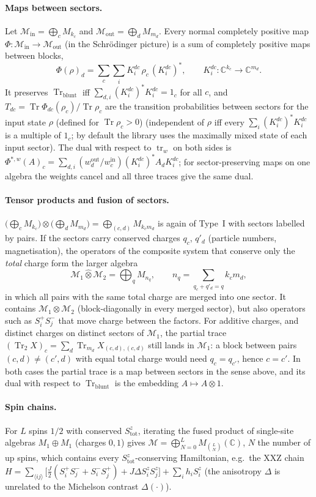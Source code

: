 \documentclass[11pt]{article}
\DeclareMathOperator{\Tr}{Tr}
\newcommand{\C}{\mathbb{C}}
\newcommand{\M}{\mathcal{M}}
\begin{document}
\paragraph{Maps between sectors.} Let $\M_{\mathrm{in}}=\bigoplus_c M_{k_c}$ and
$\M_{\mathrm{out}}=\bigoplus_d M_{m_d}$. Every normal completely positive map
$\Phi:\M_{\mathrm{in}}\to\M_{\mathrm{out}}$ (in the Schrödinger picture) is a sum of completely
positive maps between blocks,
\[
  \Phi(\rho)_d=\sum_c\sum_i K^{dc}_i\,\rho_c\,(K^{dc}_i)^*,\qquad K^{dc}_i:\C^{k_c}\to\C^{m_d}.
\]
It preserves $\Tr_{\mathrm{blunt}}$ iff $\sum_{d,i}(K_i^{dc})^*K_i^{dc}=1_c$ for all $c$, and
$T_{dc}=\Tr\Phi_{dc}(\rho_c)/\Tr\rho_c$ are the transition probabilities between sectors for the input
state $\rho$ (defined for $\Tr\rho_c>0$) (independent of $\rho$ iff every $\sum_i(K_i^{dc})^*K_i^{dc}$ is a multiple of $1_c$; by default the
library uses the maximally mixed state of each input sector). The dual
with respect to $\operatorname{tr}_w$ on both sides is
$\Phi^{*,w}(A)_c=\sum_{d,i}(w^{\mathrm{out}}_d/w^{\mathrm{in}}_c)(K_i^{dc})^*A_dK_i^{dc}$; for
sector-preserving maps on one algebra the weights cancel and all three traces give the same dual.

\paragraph{Tensor products and fusion of sectors.} $\bigl(\bigoplus_cM_{k_c}\bigr)\otimes\bigl(\bigoplus_dM_{m_d}\bigr)
=\bigoplus_{(c,d)}M_{k_cm_d}$ is again of Type~I with sectors labelled by pairs. If the sectors carry
conserved charges $q_c$, $q'_d$ (particle numbers, magnetisation), the operators of the composite system
that conserve only the \emph{total} charge form the larger algebra
\[
  \M_1\mathbin{\hat\otimes}\M_2=\bigoplus_q M_{n_q},\qquad n_q=\sum_{q_c+q'_d=q}k_cm_d ,
\]
in which all pairs with the same total charge are merged into one sector. It contains $\M_1\otimes\M_2$
(block-diagonally in every merged sector), but also operators such as $S^+_iS^-_j$ that move charge
between the factors. For additive charges, and distinct charges on distinct sectors of $\M_1$, the partial trace
$(\Tr_2X)_c=\sum_d\Tr_{m_d}X_{(c,d),(c,d)}$ still lands in $\M_1$: a block between pairs $(c,d)\ne(c',d)$ with equal
total charge would need $q_c=q_{c'}$, hence $c=c'$.
In both cases the partial trace is a map between sectors in the sense above, and its dual with respect
to $\Tr_{\mathrm{blunt}}$ is the embedding $A\mapsto A\otimes1$.

\paragraph{Spin chains.} For $L$ spins $1/2$ with conserved $S^z_{\mathrm{tot}}$, iterating the fused
product of single-site algebras $M_1\oplus M_1$ (charges $0,1$) gives
$\M=\bigoplus_{N=0}^LM_{\binom LN}(\C)$, $N$ the number of up spins, which contains every
$S^z_{\mathrm{tot}}$-conserving Hamiltonian, e.g.\ the XXZ chain
$H=\sum_{\langle ij\rangle}\bigl[\tfrac J2(S^+_iS^-_j+S^-_iS^+_j)+J\Delta S^z_iS^z_j\bigr]+\sum_ih_iS^z_i$ (the
anisotropy $\Delta$ is unrelated to the Michelson contrast $\Delta(\cdot)$).
\end{document}
